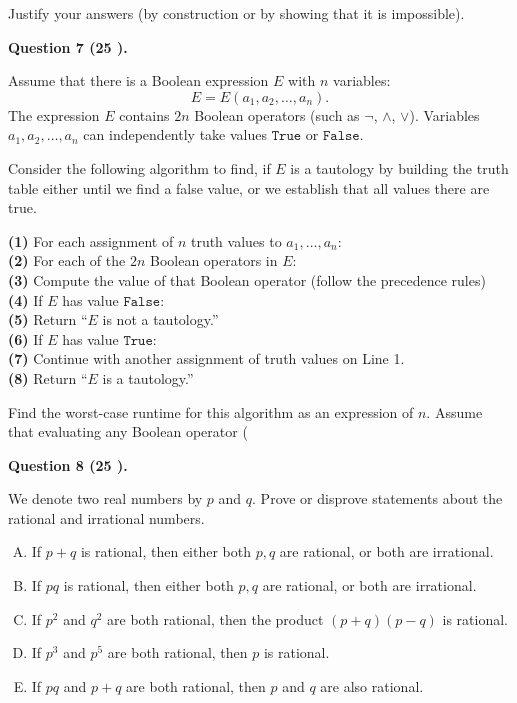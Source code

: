 \documentclass[jou]{apa6}
\begin{document}
Justify your answers (by construction or by showing that it is impossible).


\vspace{10pt}
{\bf Question 7 (25 \textperthousand{}).}

Assume that there is a Boolean expression $E$ with $n$ variables: 
$$E = E(a_1,a_2,\ldots,a_n).$$
The expression $E$ contains $2n$ Boolean operators (such as $\neg$, $\wedge$, $\vee$).
Variables $a_1,a_2,\ldots,a_n$ can independently take values 
$\mathtt{True}$ or $\mathtt{False}$.

Consider the following algorithm to find, if $E$ is a tautology by 
building the truth table \textendash{} either until we find a false value, or 
we establish that all values there are true.

{\bf (1)} \hspace{0.0in} For each assignment of $n$ truth values to $a_1,\ldots,a_n$:\\
{\bf (2)} \hspace{0.5in} For each of the $2n$ Boolean operators in $E$:\\
{\bf (3)} \hspace{1.0in} Compute the value of that Boolean operator (follow the precedence rules)\\
{\bf (4)} \hspace{0.5in} If $E$ has value $\mathtt{False}$:\\
{\bf (5)} \hspace{1.0in} Return ``$E$ is not a tautology.''\\
{\bf (6)} \hspace{0.5in} If $E$ has value $\mathtt{True}$:\\
{\bf (7)} \hspace{1.0in} Continue with another assignment of truth values on Line 1.\\
{\bf (8)} \hspace{0.0in} Return ``$E$ is a tautology.''

Find the worst-case runtime for this algorithm as an expression of $n$. 
Assume that evaluating any Boolean operator (

\vspace{10pt}
{\bf Question 8 (25 \textperthousand{}).}

We denote two real numbers by $p$ and $q$. 
Prove or disprove statements about the rational and irrational numbers. 

\begin{enumerate}[(A)]
\item If $p + q$ is rational, then either both $p,q$ are rational, or both are irrational. 
\item If $pq$ is rational, then either both $p,q$ are rational, or both are irrational. 
\item If $p^2$ and $q^2$ are both rational, then the product $(p+q)(p-q)$ is rational. 
\item If $p^3$ and $p^5$ are both rational, then $p$ is rational.
\item If $pq$ and $p+q$ are both rational, then $p$ and $q$ are also rational.
\end{enumerate}
\end{document}
